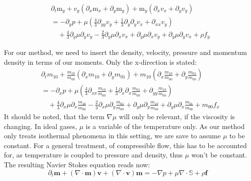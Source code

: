 \documentclass{article}
\begin{document}
\begin{equation}
  \begin{aligned}
    & \partial_t \text{m}_y
    + v_y (\partial_x \text{m}_x + \partial_y \text{m}_y)
    + \text{m}_y (\partial_x v_x + \partial_y v_y)  \\
    & =
     - \partial_y p
     + \mu \left(\frac{4}{3}\partial_{yy}v_y
            + \frac{1}{3}\partial_y\partial_y v_x
            + \partial_{xx} v_y \right) \\
    &\quad + \frac{4}{3}\partial_y \mu \partial_y v_y
    - \frac{2}{3}\partial_y \mu \partial_x v_x
    + \partial_y \mu \partial_x v_y
    + \partial_y \mu \partial_y v_x
    + \rho f_y
  \end{aligned}
\end{equation}

For our method, we need to insert the density, velocity, pressure and momentum density in terms of our moments.
Only the x-direction is stated:
\begin{equation}
  \begin{aligned}
    & \partial_t m_{10}
    + \frac{m_{10}}{m_{00}} (\partial_x m_{10} + \partial_y m_{01})
    + m_{10} (\partial_x \frac{m_{10}}{m_{00}} + \partial_y \frac{m_{01}}{m_{00}})  \\
    & =
     - \partial_x p
     + \mu \left(\frac{4}{3}\partial_{xx}\frac{m_{10}}{m_{00}}
            + \frac{1}{3}\partial_x\partial_x \frac{m_{01}}{m_{00}}
            + \partial_{yy} \frac{m_{10}}{m_{00}} \right) \\
    &\quad + \frac{4}{3}\partial_x \mu \partial_x \frac{m_{10}}{m_{00}}
    - \frac{2}{3}\partial_x \mu \partial_y \frac{m_{01}}{m_{00}}
    + \partial_y \mu \partial_y \frac{m_{10}}{m_{00}}
    + \partial_y \mu \partial_x \frac{m_{01}}{m_{00}}
    + m_{00}f_x
  \end{aligned}
\end{equation}
It should be noted, that the term $\nabla \mu$ will only be relevant, if the viscosity is changing. In ideal gases, $\mu$ is a variable of the temperature only. As our method only treats isothermal phenomena in this setting, we are save to assume $\mu$ to be constant.
For a general treatment, of compressible flow, this has to be accounted for, as temperature is coupled to pressure and density, thus $\mu$ won't be constant.
The resulting Navier Stokes equation reads now:
\begin{equation}
  \label{eq:compressible NS isotherm}
  \partial_t \mathbf{m} + (\nabla \cdot \mathbf{m})\mathbf{v} + (\nabla \cdot \mathbf{v})\mathbf{m}
    = - \nabla p + \mu \nabla \cdot \mathbb{S} + \rho \mathbf{f}
\end{equation}
\end{document}
